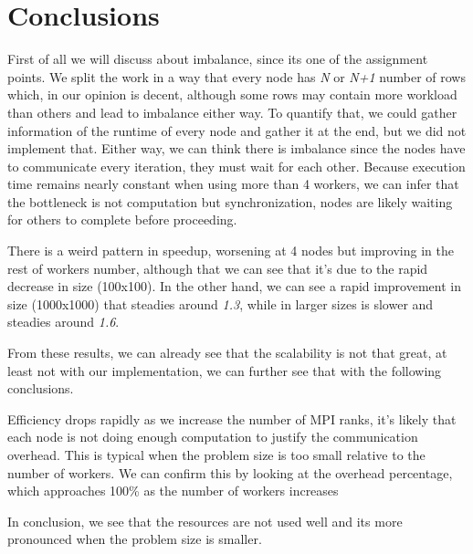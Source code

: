 \documentclass[../main.tex]{subfiles}
\begin{document}
\section{Conclusions}

First of all we will discuss about imbalance, since its one of the assignment points. We split the work in a way that every node has \textit{N} or \textit{N+1} number of rows which, in our opinion is decent, although some rows may contain more workload than others and lead to imbalance either way.
To quantify that, we could gather information of the runtime of every node and gather it at the end, but we did not implement that. Either way, we can think there is imbalance since the nodes have to communicate every iteration, they must wait for each other. Because execution time remains nearly constant when using more than 4 workers, we can infer that the bottleneck is not computation but synchronization, nodes are likely waiting for others to complete before proceeding.


There is a weird pattern in speedup, worsening at 4 nodes but improving in the rest of workers number, although that we can see that it's due to the rapid decrease in size (100x100).
In the other hand, we can see a rapid improvement in size (1000x1000) that steadies around \textit{1.3}, while in larger sizes is slower and steadies around \textit{1.6}.


From these results, we can already see that the scalability is not that great, at least not with our implementation, we can further see that with the following conclusions.

Efficiency drops rapidly as we increase the number of MPI ranks, it's likely that each node is not doing enough computation to justify the communication overhead. This is typical when the problem size is too small relative to the number of workers.
We can confirm this by looking at the overhead percentage, which approaches 100\% as the number of workers increases


In conclusion, we see that the resources are not used well and its more pronounced when the problem size is smaller.
\end{document}
